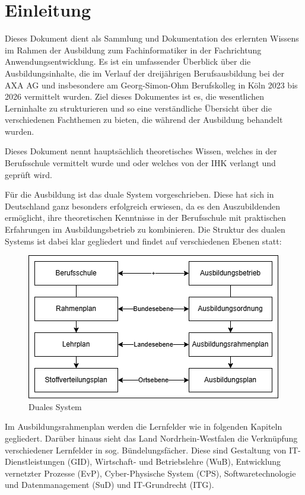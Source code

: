 \section{Einleitung}

Dieses Dokument dient als Sammlung und Dokumentation des erlernten Wissens im Rahmen der Ausbildung zum Fachinformatiker in der Fachrichtung Anwendungsentwicklung. Es ist ein umfassender Überblick über die Ausbildungsinhalte, die im Verlauf der dreijährigen Berufsausbildung bei der AXA AG und insbesondere am Georg-Simon-Ohm Berufskolleg in Köln 2023 bis 2026 vermittelt wurden. Ziel dieses Dokumentes ist es, die wesentlichen Lerninhalte zu strukturieren und so eine verständliche Übersicht über die verschiedenen Fachthemen zu bieten, die während der Ausbildung behandelt wurden.

Dieses Dokument nennt hauptsächlich theoretisches Wissen, welches in der Berufsschule vermittelt wurde und oder welches von der IHK verlangt und geprüft wird.

Für die Ausbildung ist das duale System vorgeschrieben. Diese hat sich in Deutschland ganz besonders erfolgreich erwiesen, da es den Auszubildenden ermöglicht, ihre theoretischen Kenntnisse in der Berufsschule mit praktischen Erfahrungen im Ausbildungsbetrieb zu kombinieren. Die Struktur des dualen Systems ist dabei klar gegliedert und findet auf verschiedenen Ebenen statt:

\begin{figure}[H]
    \centering
    \includegraphics[width=\textwidth]{figures/dualesSystem.png}
    \caption{Duales System}
    \label{fig:dualesSystem}
\end{figure}
\FloatBarrier

Im Ausbildungsrahmenplan werden die Lernfelder wie in folgenden Kapiteln gegliedert. Darüber hinaus sieht das Land Nordrhein-Westfalen die Verknüpfung verschiedener Lernfelder in sog. Bündelungsfächer. Diese sind Gestaltung von IT-Dienstleistungen (GID), Wirtschaft- und Betriebslehre (WuB), Entwicklung vernetzter Prozesse (EvP), Cyber-Physische System (CPS), Softwaretechnologie und Datenmanagement (SuD) und IT-Grundrecht (ITG).

